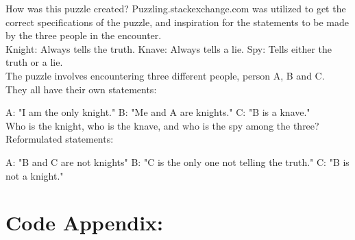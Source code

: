 \documentclass[11pt]{amsart}
\begin{document}
How was this puzzle created?
	Puzzling.stackexchange.com was utilized to get the correct specifications of the puzzle,
	and inspiration for the statements to be made by the three people in the encounter. \\

Knight: Always tells the truth.
Knave: 	Always tells a lie.
Spy: 		Tells either the truth or a lie. \\

The puzzle involves encountering three different people, person A, B and C. \\

They all have their own statements:

	A: "I am the only knight."
	B: "Me and A are knights."
	C: "B is a knave." \\

Who is the knight, who is the knave, and who is the spy among the three? \\


Reformulated statements:

	A: "B and C are not knights"
	B: "C is the only one not telling the truth."
	C: "B is not a knight." \\



\section{Code Appendix:}

\begin{verbatim}



\end{verbatim}
\end{document}
